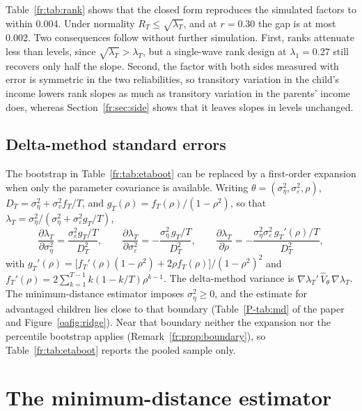 Table~\ref{fr:tab:rank} shows that the closed form reproduces the
simulated factors to within 0.004. Under normality $R_T \le \sqrt{\lambda_T}$, and at $r = 0.30$ the gap is at most 0.002. Two consequences follow without
further simulation. First, ranks attenuate less than levels, since
$\sqrt{\lambda_T} > \lambda_T$, but a single-wave rank design at
$\lambda_1 = 0.27$ still recovers only half the slope. Second, the factor
with both sides measured with error is symmetric in the two reliabilities, so transitory variation
in the child's income lowers rank slopes as much as transitory variation
in the parents' income does, whereas Section~\ref{fr:sec:side} shows
that it leaves slopes in levels unchanged.

\subsection{Delta-method standard errors}

The bootstrap in Table~\ref{fr:tab:etaboot} can be replaced by a
first-order expansion when only the parameter covariance is available.
Writing $\theta = (\sigma^2_\eta, \sigma^2_\varepsilon, \rho)$,
$D_T = \sigma^2_\eta + \sigma^2_v f_T/T$, and
$g_T(\rho) = f_T(\rho)/(1-\rho^2)$, so that
$\lambda_T = \sigma^2_\eta/(\sigma^2_\eta + \sigma^2_\varepsilon g_T/T)$,
\begin{equation}
\frac{\partial \lambda_T}{\partial \sigma^2_\eta} = \frac{\sigma^2_\varepsilon g_T/T}{D_T^2}, \qquad
\frac{\partial \lambda_T}{\partial \sigma^2_\varepsilon} = -\frac{\sigma^2_\eta\, g_T/T}{D_T^2}, \qquad
\frac{\partial \lambda_T}{\partial \rho} = -\frac{\sigma^2_\eta\sigma^2_\varepsilon\, g_T'(\rho)/T}{D_T^2},
\label{fr:eq:delta}
\end{equation}
with $g_T'(\rho) = \big[f_T'(\rho)(1-\rho^2) + 2\rho f_T(\rho)\big]/(1-\rho^2)^2$
and $f_T'(\rho) = 2\sum_{k=1}^{T-1}k(1-k/T)\rho^{k-1}$. The delta-method
variance is $\nabla\lambda_T' \,\hat V_\theta\, \nabla\lambda_T$. The
minimum-distance estimator imposes $\sigma^2_\eta \ge 0$, and the estimate
for advantaged children lies close to that boundary
(Table~\ref{P-tab:md} of the paper and Figure~\ref{oafig:ridge}). Near that boundary neither the expansion nor the percentile bootstrap applies (Remark~\ref{fr:prop:boundary}), so Table~\ref{fr:tab:etaboot} reports the pooled sample only.

\section{The minimum-distance estimator}
\label{fr:sec:md}

